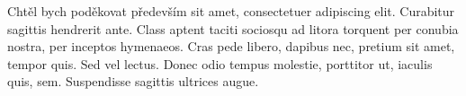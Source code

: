 \documentclass[slovak,master,oneside]{ctufit-thesis}
\begin{document}
\frontmatter\frontmatterinit%

\thispagestyle{empty}\maketitle\thispagestyle{empty}\cleardoublepage%


\imprintpage%
\stopTOCentries

\begin{acknowledgmentpage}
	Chtěl bych poděkovat především sit amet, consectetuer adipiscing elit. Curabitur sagittis hendrerit ante. Class aptent taciti sociosqu ad litora torquent per conubia nostra, per inceptos hymenaeos. Cras pede libero, dapibus nec, pretium sit amet, tempor quis. Sed vel lectus. Donec odio tempus molestie, porttitor ut, iaculis quis, sem. Suspendisse sagittis ultrices augue.
\end{acknowledgmentpage}
\end{document}
